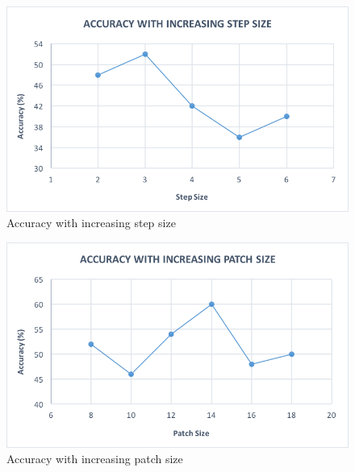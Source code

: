 \documentclass[a4paper]{article}
\begin{document}
\begin{figure}[h!]
  \centering
  \includegraphics[width=1\textwidth]{step}
  \caption{Accuracy with increasing step size}
\end{figure}

\begin{figure}[h!]
  \centering
  \includegraphics[width=1\textwidth]{patch}
  \caption{Accuracy with increasing patch size}
\end{figure}

\newpage
\clearpage


\end{document}
